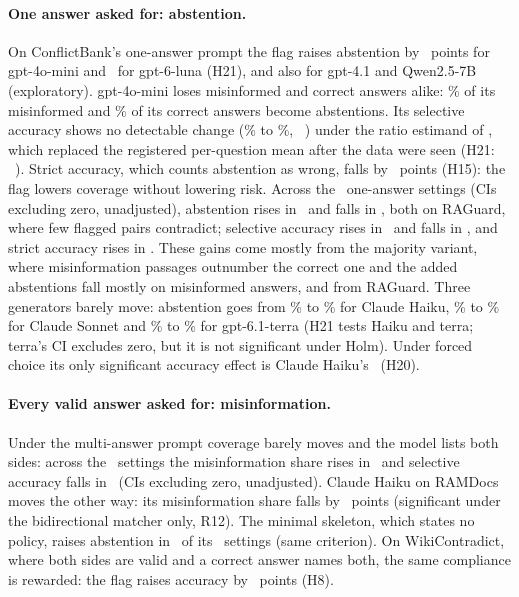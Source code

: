 \paragraph{One answer asked for: abstention.}
On ConflictBank's one-answer prompt the flag raises abstention by \ahTwentyOneSgMiniFlagAbstain\ points for
gpt-4o-mini and \ahTwentyOneSgLunaFlagAbstain\ for gpt-6-luna (H21), and also for gpt-4.1 and Qwen2.5-7B
(exploratory). gpt-4o-mini loses misinformed and correct answers alike: \trSgMiniNeutralMisinfoAbstain\% of its
misinformed and \trSgMiniNeutralCorrectAbstain\% of its correct answers become abstentions. Its selective accuracy
shows no detectable change (\selRSgMiniFlagA\% to \selRSgMiniFlagB\%, \selRSgMiniFlag\ \selRSgMiniFlagCI) under the
ratio estimand of , which replaced the registered per-question mean after the data were seen (H21:
\hTwentyOneSgMiniFlagSelective\ \hTwentyOneSgMiniFlagSelectiveCI). Strict accuracy, which counts abstention as
wrong, falls by \azSgMiniOracleFlagConflict\ points (H15): the flag lowers coverage without lowering risk. Across the
\rcSingleN\ one-answer settings (CIs excluding zero, unadjusted), abstention rises in \rcSingleAbstUp\ and falls in
\rcSingleAbstDown, both on RAGuard, where few flagged pairs contradict; selective accuracy rises in \rcSingleSelUp\
and falls in \rcSingleSelDown, and strict accuracy rises in \rcSingleStrictUp. These gains come mostly from the
majority variant, where misinformation passages outnumber the correct one and the added abstentions fall mostly on
misinformed answers, and from RAGuard. Three generators barely move: abstention goes from
\zmSgHaikuPlainOutAbstain\% to \zmSgHaikuOracleFlagOutAbstain\% for Claude Haiku, \zmSgSonnetPlainOutAbstain\% to
\zmSgSonnetOracleFlagOutAbstain\% for Claude Sonnet and \zmSgTerraPlainOutAbstain\% to
\zmSgTerraOracleFlagOutAbstain\% for gpt-6.1-terra (H21 tests Haiku and terra; terra's CI excludes zero, but it is
not significant under Holm). Under forced choice its only significant accuracy effect is Claude Haiku's
\hTwentyFcHaikuFlag\ (H20).

\paragraph{Every valid answer asked for: misinformation.}
Under the multi-answer prompt coverage barely moves and the model lists both sides: across the \rcMultiN\ settings
the misinformation share rises in \rcMultiMisUp\ and selective accuracy falls in \rcMultiSelDown\ (CIs excluding
zero, unadjusted). Claude Haiku on RAMDocs moves the other way: its misinformation share falls by
\aoneWayBoldLostDiff\ points (significant under the bidirectional matcher only, R12). The minimal skeleton, which
states no policy, raises abstention in \rcMinimalAbstUp\ of its \rcMinimalN\ settings (same criterion). On
WikiContradict, where both sides are valid and a correct answer names both, the same compliance is rewarded: the flag
raises accuracy by \awikiOracleFlag\ points (H8).

